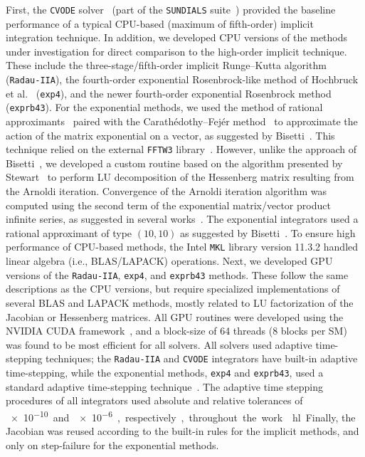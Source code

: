 \documentclass[preprint,review,11pt]{elsarticle}
\DeclareRobustCommand{\hlg}[1]{\sethlcolor{green}\hl{#1}}
\DeclareRobustCommand{\hlg}[1]{\empty{#1}}
\begin{document}
First, the \texttt{CVODE} solver~\cite{Hindmarsh:2005hg,cvode:2.8.2} (part of the \texttt{SUNDIALS} suite~\cite{sundials:2.6.2}) provided the baseline performance of a typical CPU-based (maximum of fifth-order) implicit integration technique.
In addition, we developed CPU versions of the methods under investigation for direct comparison to the high-order implicit technique.
These include the three-stage\slash fifth-order implicit Runge--Kutta algorithm~\cite{wanner1991solving} (\texttt{Radau-IIA}), the fourth-order exponential Rosenbrock-like method of Hochbruck et al.~\cite{Hochbruck:1998} (\texttt{exp4}), and the newer fourth-order exponential Rosenbrock method~\cite{Hockbruck:2009} (\texttt{exprb43}).
For the exponential methods, we used the method of rational approximants~\cite{gallopoulos:1992} paired with the Carath\'edothy--Fej\'er method~\cite{trefethen:2006,kyle_niemeyer_2016_44291} to approximate the action of the matrix exponential on a vector, as suggested by Bisetti~\cite{Bisetti:2012jw}.
This technique relied on the external \texttt{FFTW3} library~\cite{frigo2005design,fftw:3.3.4}.
However, unlike the approach of Bisetti~\cite{Bisetti:2012jw}, we developed a custom routine based on the algorithm presented by Stewart~\cite{stewart:1998} to perform LU decomposition of the Hessenberg matrix resulting from the Arnoldi iteration.
Convergence of the Arnoldi iteration algorithm was computed using the second term of the exponential matrix\slash vector product infinite series, as suggested in several works~\cite{Bisetti:2012jw,saad:1992}.
The exponential integrators used a rational approximant of type $\left(10,10\right)$ as suggested by Bisetti~\cite{Bisetti:2012jw}.
To ensure high performance of CPU-based methods, the Intel \texttt{MKL} library version 11.3.2 handled linear algebra (i.e., BLAS\slash LAPACK) operations.
Next, we developed GPU versions of the \texttt{Radau-IIA}, \texttt{exp4}, and \texttt{exprb43} methods.
These follow the same descriptions as the CPU versions, but require specialized implementations of several BLAS and LAPACK methods, mostly related to LU factorization of the Jacobian or Hessenberg matrices.
All GPU routines were developed using the NVIDIA CUDA framework~\cite{Buck:2008aa,NVIDIA:2015aa}, and a block-size of 64 threads (8 blocks per SM) was found to be most efficient for all solvers.
All solvers used adaptive time-stepping techniques; the \texttt{Radau-IIA} and \texttt{CVODE} integrators have built-in adaptive time-stepping, while the exponential methods, \texttt{exp4} and \texttt{exprb43}, used a standard adaptive time-stepping technique~\cite{wanner1991solving}.
The adaptive time stepping procedures of all integrators used absolute and relative tolerances of \SI{e-10} and \SI{e-6}, respectively, throughout the work.
\hlg{Finally, the Jacobian was reused according to the built-in rules for the implicit methods, and only on step-failure for the exponential methods.}
\end{document}
